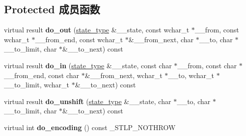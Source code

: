 \subsection*{Protected 成员函数}
\begin{DoxyCompactItemize}
\item 
\mbox{\label{classcodecvt__byname_3_01wchar__t_00_01char_00_01mbstate__t_01_4_a9c3525bc5b561068aabd4cf967d249f0}} 
virtual result {\bfseries do\+\_\+out} (\hyperlink{struct____mbstate__t}{state\+\_\+type} \&\+\_\+\+\_\+state, const wchar\+\_\+t $\ast$\+\_\+\+\_\+from, const wchar\+\_\+t $\ast$\+\_\+\+\_\+from\+\_\+end, const wchar\+\_\+t $\ast$\&\+\_\+\+\_\+from\+\_\+next, char $\ast$\+\_\+\+\_\+to, char $\ast$\+\_\+\+\_\+to\+\_\+limit, char $\ast$\&\+\_\+\+\_\+to\+\_\+next) const
\item 
\mbox{\label{classcodecvt__byname_3_01wchar__t_00_01char_00_01mbstate__t_01_4_a750ed1c5bd9b99f2635accbbdd4c718f}} 
virtual result {\bfseries do\+\_\+in} (\hyperlink{struct____mbstate__t}{state\+\_\+type} \&\+\_\+\+\_\+state, const char $\ast$\+\_\+\+\_\+from, const char $\ast$\+\_\+\+\_\+from\+\_\+end, const char $\ast$\&\+\_\+\+\_\+from\+\_\+next, wchar\+\_\+t $\ast$\+\_\+\+\_\+to, wchar\+\_\+t $\ast$\+\_\+\+\_\+to\+\_\+limit, wchar\+\_\+t $\ast$\&\+\_\+\+\_\+to\+\_\+next) const
\item 
\mbox{\label{classcodecvt__byname_3_01wchar__t_00_01char_00_01mbstate__t_01_4_a63d6e0557cd2da5e49589bc23123e4d9}} 
virtual result {\bfseries do\+\_\+unshift} (\hyperlink{struct____mbstate__t}{state\+\_\+type} \&\+\_\+\+\_\+state, char $\ast$\+\_\+\+\_\+to, char $\ast$\+\_\+\+\_\+to\+\_\+limit, char $\ast$\&\+\_\+\+\_\+to\+\_\+next) const
\item 
\mbox{\label{classcodecvt__byname_3_01wchar__t_00_01char_00_01mbstate__t_01_4_a395313bf3d5c30a5d9873a2304a8176a}} 
virtual int {\bfseries do\+\_\+encoding} () const \+\_\+\+S\+T\+L\+P\+\_\+\+N\+O\+T\+H\+R\+OW
\item 
\mbox{\label{classcodecvt__byname_3_01wchar__t_00_01char_00_01mbstate__t_01_4_a68da319ffaa244b610a3966e9c134f44}} 

\end{DoxyCompactItemize}
